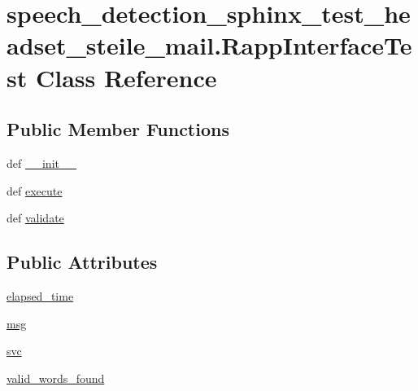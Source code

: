 \hypertarget{classspeech__detection__sphinx__test__headset__steile__mail_1_1RappInterfaceTest}{\section{speech\-\_\-detection\-\_\-sphinx\-\_\-test\-\_\-headset\-\_\-steile\-\_\-mail.\-Rapp\-Interface\-Test Class Reference}
\label{classspeech__detection__sphinx__test__headset__steile__mail_1_1RappInterfaceTest}
}
\subsection*{Public Member Functions}
\begin{DoxyCompactItemize}
\item 
def \hyperlink{classspeech__detection__sphinx__test__headset__steile__mail_1_1RappInterfaceTest_ae364ca3bf9f267d6ce2a6c23d1cbbdcb}{\-\_\-\-\_\-init\-\_\-\-\_\-}
\item 
def \hyperlink{classspeech__detection__sphinx__test__headset__steile__mail_1_1RappInterfaceTest_a2403c2860814225242e240eba682cdd5}{execute}
\item 
def \hyperlink{classspeech__detection__sphinx__test__headset__steile__mail_1_1RappInterfaceTest_af60bdcb1162dce2a3e1001d21c13d247}{validate}
\end{DoxyCompactItemize}
\subsection*{Public Attributes}
\begin{DoxyCompactItemize}
\item 
\hyperlink{classspeech__detection__sphinx__test__headset__steile__mail_1_1RappInterfaceTest_a73029b423f48d57aef0ca43126dec755}{elapsed\-\_\-time}
\item 
\hyperlink{classspeech__detection__sphinx__test__headset__steile__mail_1_1RappInterfaceTest_a0913b0eb37f8fa1c634adc814a63aeff}{msg}
\item 
\hyperlink{classspeech__detection__sphinx__test__headset__steile__mail_1_1RappInterfaceTest_afce233deb70adc082745ccc4d5b04a6b}{svc}
\item 
\hyperlink{classspeech__detection__sphinx__test__headset__steile__mail_1_1RappInterfaceTest_a74a33a32932e88ab5786f90fd23f89bd}{valid\-\_\-words\-\_\-found}
\end{DoxyCompactItemize}


